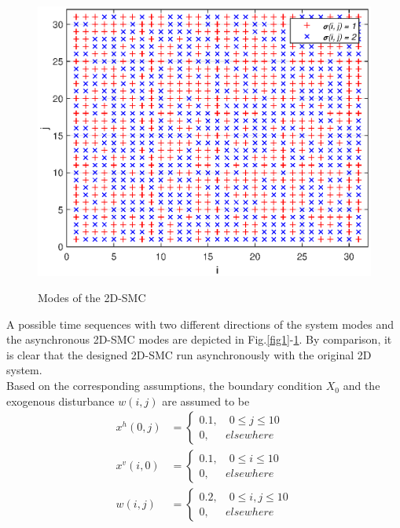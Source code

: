 \documentclass[conference]{IEEEtran}
\begin{document}
\begin{figure}[!htb]
	\centering\includegraphics[scale=0.6]{./simulations/sigma_eps.eps}\\ 
	\caption{Modes of the 2D-SMC}
	\label{fig2}
\end{figure}
A possible time sequences with two different directions of the system modes and the asynchronous 2D-SMC modes are depicted in Fig.\ref{fig1}-\ref{fig2}. By comparison, it is clear that the designed 2D-SMC run asynchronously with the original 2D system.  \\
Based on the corresponding assumptions, the boundary condition $X_{0}$ and  the exogenous disturbance $w(i,j)$ are assumed to be
\begin{equation*}
\begin{aligned}
	x^{h}(0, j)&=\begin{cases}
		0.1, \quad 0\leq j \leq 10 \\
		0, \quad \ \ elsewhere
	\end{cases} \\
	x^{v}(i, 0)&=\begin{cases}
	0.1, \quad 0\leq i \leq 10 \\
	0, \quad \ \ elsewhere
	\end{cases}\\
	w(i, j)\ &=\begin{cases}
	0.2, \quad 0\leq i,j \leq 10 \\
	0, \quad \ \ elsewhere
	\end{cases}
\end{aligned}
\end{equation*}
\end{document}
